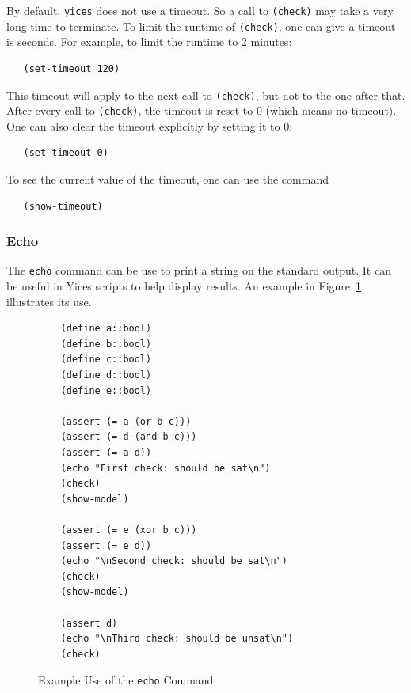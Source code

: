 \documentclass[11pt,twoside,fleqn,openright,titlepage]{cslreport}
\begin{document}
By default, \texttt{yices} does not use a timeout. So a call to
\texttt{(check)} may take a very long time to terminate. To limit the
runtime of \texttt{(check)}, one can give a timeout is seconds. For
example, to limit the runtime to 2 minutes:
\begin{small}
\begin{verbatim}
   (set-timeout 120)
\end{verbatim}
\end{small}
This timeout will apply to the next call to \texttt{(check)}, but not
to the one after that. After every call to \texttt{(check)}, the
timeout is reset to 0 (which means no timeout). One can also clear the
timeout explicitly by setting it to 0:
\begin{small}
\begin{verbatim}
   (set-timeout 0)
\end{verbatim}
\end{small}
To see the current value of the timeout, one can use the command
\begin{small}
\begin{verbatim}
   (show-timeout)
\end{verbatim}
\end{small}

\subsubsection*{Echo}

The \texttt{echo} command can be use to print a string on the standard
output. It can be useful in Yices scripts to help display
results. An example in Figure~\ref{example-echo} illustrates its use.

\begin{figure}
\begin{center}
\begin{footnotesize}
\begin{verbatim}
    (define a::bool)
    (define b::bool)
    (define c::bool)
    (define d::bool)
    (define e::bool)

    (assert (= a (or b c)))
    (assert (= d (and b c)))
    (assert (= a d))
    (echo "First check: should be sat\n")
    (check)
    (show-model)

    (assert (= e (xor b c)))
    (assert (= e d))
    (echo "\nSecond check: should be sat\n")
    (check)
    (show-model)

    (assert d)
    (echo "\nThird check: should be unsat\n")
    (check)
\end{verbatim}
\end{footnotesize}
\end{center}
\caption{Example Use of the \texttt{echo} Command}
\label{example-echo}
\end{figure}
\end{document}
